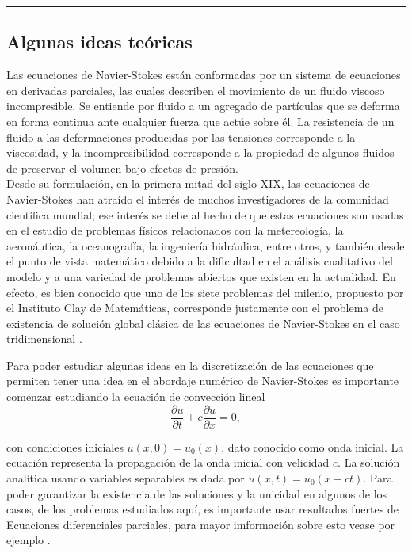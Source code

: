 \documentclass[A4,11pt]{article}
\begin{document}
\begin{center}\rule{0.9\textwidth}{0.1mm}
\end{center}
\begin{multicols}{2}
\section{Algunas ideas teóricas}

Las ecuaciones de Navier-Stokes están conformadas por un sistema de ecuaciones en derivadas parciales, las cuales describen el movimiento de un fluido viscoso incompresible. Se entiende por fluido a un agregado de partículas que se deforma en forma continua ante cualquier fuerza que actúe sobre él. La resistencia de un fluido a las deformaciones producidas por las tensiones corresponde a la viscosidad, y la incompresibilidad corresponde a la propiedad de algunos fluidos de preservar el volumen bajo efectos de presión.\\

Desde su formulación, en la primera mitad del siglo XIX, las ecuaciones de
Navier-Stokes han atraído el interés de muchos investigadores de la comunidad
científica mundial; ese interés se debe al hecho de que estas ecuaciones son
usadas en el estudio de problemas físicos relacionados con la metereología, la
aeronáutica, la oceanografía, la ingeniería hidráulica, entre otros, y también
desde el punto de vista matemático debido a la dificultad en el análisis cualitativo del
modelo y a una variedad de problemas abiertos que existen en la actualidad. En
efecto, es bien conocido que uno de los siete problemas del milenio, propuesto
por el Instituto Clay de Matemáticas, corresponde justamente con el problema de
existencia de solución global clásica de las ecuaciones de Navier-Stokes en el
caso tridimensional \cite{ClayM}.




 Para poder estudiar algunas ideas en la discretización de las ecuaciones que permiten tener una idea en el abordaje numérico de Navier-Stokes es importante comenzar estudiando la ecuación de convección lineal
\begin{equation}
	\label{ecl}
	\frac{\partial u}{\partial t} + c \frac{\partial u}{\partial x} = 0,
\end{equation}

con condiciones iniciales $u(x,0)=u_0(x)$, dato conocido como onda inicial. La ecuación representa la propagación de la onda inicial con velicidad $c$. La solución analítica usando variables separables es dada por $u(x,t)=u_0(x-ct)$. Para poder garantizar la existencia de las soluciones y la unicidad en algunos de los casos, de los problemas estudiados aquí, es importante usar resultados fuertes de Ecuaciones diferenciales parciales, para mayor imformación sobre esto vease por ejemplo \cite{Girault}.\\


\end{multicols}
\end{document}
